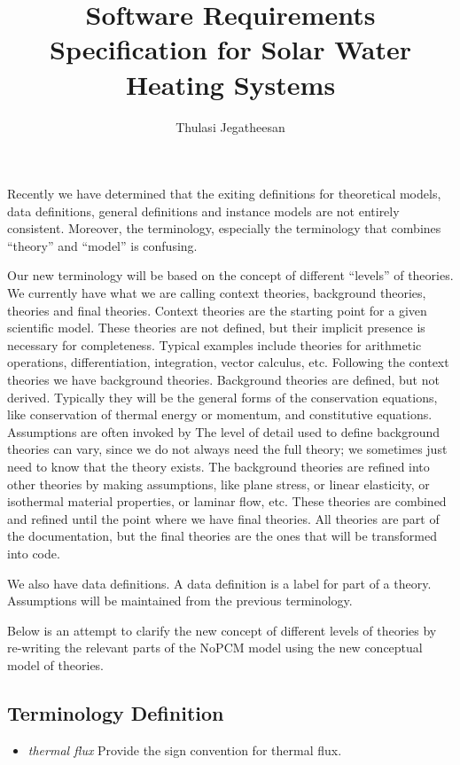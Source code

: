 \documentclass[12pt]{article}
\title{Software Requirements Specification for Solar Water Heating Systems}
\author{Thulasi Jegatheesan}
\begin{document}
Recently we have determined that the exiting definitions for theoretical models,
data definitions, general definitions and instance models are not entirely
consistent.  Moreover, the terminology, especially the terminology that combines
``theory'' and ``model'' is confusing.

Our new terminology will be based on the concept of different ``levels'' of
theories.  We currently have what we are calling context theories, background
theories, theories and final theories.  Context theories are the starting point
for a given scientific model.  These theories are not defined, but their
implicit presence is necessary for completeness.  Typical examples include
theories for arithmetic operations, differentiation, integration, vector
calculus, etc.  Following the context theories we have background theories.
Background theories are defined, but not derived.  Typically they will be the
general forms of the conservation equations, like conservation of thermal energy
or momentum, and constitutive equations.  Assumptions are often invoked by The
level of detail used to define background theories can vary, since we do not
always need the full theory; we sometimes just need to know that the theory
exists.  The background theories are refined into other theories by making
assumptions, like plane stress, or linear elasticity, or isothermal material
properties, or laminar flow, etc.  These theories are combined and refined until
the point where we have final theories. All theories are part of the
documentation, but the final theories are the ones that will be transformed into
code.

We also have data definitions.  A data definition is a label for part of a
theory. Assumptions will be maintained from the previous terminology.

Below is an attempt to clarify the new concept of different levels of theories
by re-writing the relevant parts of the NoPCM model using the new conceptual
model of theories.


\subsection{Terminology Definition}

\begin{itemize}
\item \textit{thermal flux} {Provide the sign convention for thermal flux.}
\end{itemize}
\end{document}
